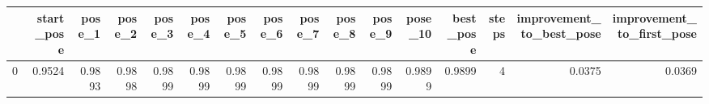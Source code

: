 \begin{tabular}{lrrrrrrrrrrrrrrr}
\toprule
{} &  start\_pose &  pose\_1 &  pose\_2 &  pose\_3 &  pose\_4 &  pose\_5 &  pose\_6 &  pose\_7 &  pose\_8 &  pose\_9 &  pose\_10 &  best\_pose &  steps &  improvement\_to\_best\_pose &  improvement\_to\_first\_pose \\
\midrule
0 &      0.9524 &  0.9893 &  0.9898 &  0.9899 &  0.9899 &  0.9899 &  0.9899 &  0.9899 &  0.9899 &  0.9899 &   0.9899 &     0.9899 &      4 &                    0.0375 &                     0.0369 \\
\bottomrule
\end{tabular}
